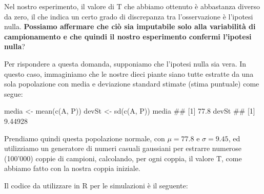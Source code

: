 \documentclass[a4paper,12pt,oneside]{book}
\newenvironment{Shaded}{\begin{snugshade}}{\end{snugshade}}
\newcommand{\DocumentationTok}[1]{#1}
\newcommand{\OtherTok}[1]{#1}
\newcommand{\FunctionTok}[1]{#1}
\newcommand{\NormalTok}[1]{#1}
\begin{document}
Nel nostro esperimento, il valore di T che abbiamo ottenuto è abbastanza diverso da zero, il che indica un certo grado di discrepanza tra l'osservazione è l'ipotesi nulla. \textbf{Possiamo affermare che ciò sia imputabile solo alla variabilità di campionamento e che quindi il nostro esperimento confermi l'ipotesi nulla}?

Per rispondere a questa domanda, supponiamo che l'ipotesi nulla sia vera. In questo caso, immaginiamo che le nostre dieci piante siano tutte estratte da una sola popolazione con media e deviazione standard stimate (stima puntuale) come segue:

\begin{Shaded}
\begin{Highlighting}[]
\NormalTok{media }\OtherTok{\textless{}{-}} \FunctionTok{mean}\NormalTok{(}\FunctionTok{c}\NormalTok{(A, P))}
\NormalTok{devSt }\OtherTok{\textless{}{-}} \FunctionTok{sd}\NormalTok{(}\FunctionTok{c}\NormalTok{(A, P))}
\NormalTok{media}
\DocumentationTok{\#\# [1] 77.8}
\NormalTok{devSt}
\DocumentationTok{\#\# [1] 9.44928}
\end{Highlighting}
\end{Shaded}

Prendiamo quindi questa popolazione normale, con \(\mu = 77.8\) e \(\sigma = 9.45\), ed utilizziamo un generatore di numeri casuali gaussiani per estrarre numerose (100'000) coppie di campioni, calcolando, per ogni coppia, il valore T, come abbiamo fatto con la nostra coppia iniziale.

Il codice da utilizzare in R per le simulazioni è il seguente:
\end{document}
